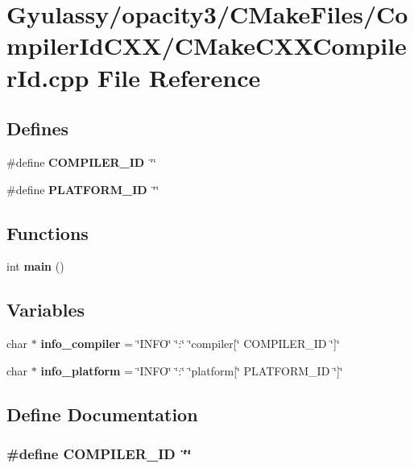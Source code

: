 \section{Gyulassy/opacity3/CMakeFiles/CompilerIdCXX/CMakeCXXCompilerId.cpp File Reference}
\label{CMakeCXXCompilerId_8cpp}
\subsection*{Defines}
\begin{CompactItemize}
\item 
\#define {\bf COMPILER\_\-ID}~\char`\"{}\char`\"{}
\item 
\#define {\bf PLATFORM\_\-ID}~\char`\"{}\char`\"{}
\end{CompactItemize}
\subsection*{Functions}
\begin{CompactItemize}
\item 
int {\bf main} ()
\end{CompactItemize}
\subsection*{Variables}
\begin{CompactItemize}
\item 
char $\ast$ {\bf info\_\-compiler} = \char`\"{}INFO\char`\"{} \char`\"{}:\char`\"{} \char`\"{}compiler[\char`\"{} COMPILER\_\-ID \char`\"{}]\char`\"{}
\item 
char $\ast$ {\bf info\_\-platform} = \char`\"{}INFO\char`\"{} \char`\"{}:\char`\"{} \char`\"{}platform[\char`\"{} PLATFORM\_\-ID \char`\"{}]\char`\"{}
\end{CompactItemize}


\subsection{Define Documentation}
\subsubsection{\setlength{\rightskip}{0pt plus 5cm}\#define COMPILER\_\-ID~\char`\"{}\char`\"{}}\label{CMakeCXXCompilerId_8cpp_81dee0709ded976b2e0319239f72d174}




